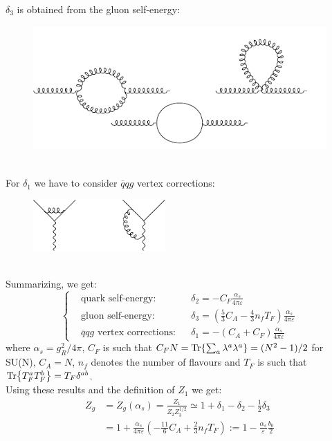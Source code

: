 \documentclass[../main.tex]{subfiles}
\begin{document}
$\delta_3$ is obtained from the gluon self-energy:\\
\begin{figure}[h]
    \centering
    \includegraphics{Images/delta3.pdf}
    \caption*{}
\end{figure}\\
For $\delta_1$ we have to consider $\overline{q}qg$ vertex corrections:\\
\begin{figure}[h]
    \centering
    \includegraphics[width=0.45\textwidth]{Images/delta1.pdf}
    \caption*{}
\end{figure}\\
Summarizing, we get:
\[
\left\{
\begin{aligned}
&\text{quark self-energy:}&&\delta_2=-C_F\frac{\alpha_s}{4\pi\varepsilon}\\
&\text{gluon self-energy:}&&\delta_3=\left(\frac{5}{3}C_A-\frac{4}{3}n_fT_F\right)\frac{\alpha_s}{4\pi\varepsilon}\\
&\text{$\overline{q}qg$ vertex corrections:}&&\delta_1=-(C_A+C_F)\frac{\alpha_s}{4\pi\varepsilon}
\end{aligned}
\right.
\]
where $\alpha_s=g_R^2/4\pi$, $C_F$ is such that $C_FN=\Tr{\sum_a\lambda^a\lambda^a}=(N^2-1)/2$ for SU(N), $C_A=N$, $n_f$ denotes the number of flavours and $T_F$ is such that $\Tr{T_F^aT_F^b}=T_F\delta^{ab}$.\\
Using these results and the definition of $Z_1$ we get:
\begin{align*}
Z_g&=Z_g(\alpha_s)=\frac{Z_1}{Z_2Z_3^{1/2}}\simeq1+\delta_1-\delta_2-\frac{1}{2}\delta_3\\
&=1+\frac{\alpha_s}{4\pi\varepsilon}\left(-\frac{11}{6}C_A+\frac{2}{3}n_fT_F\right):=1-\frac{\alpha_s}{\varepsilon}\frac{b_0}{2}
\end{align*}
\end{document}
